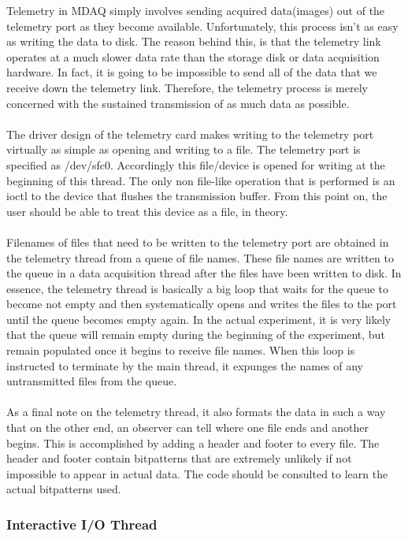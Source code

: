 Telemetry in MDAQ simply involves sending acquired data(images) out of the telemetry 
port as they become available. Unfortunately, this process isn't as easy as writing 
the data to disk. The reason behind this, is that the telemetry link operates at a 
much slower data rate than the storage disk or data acquisition hardware. In fact, it
is going to be impossible to send all of the data that we receive down the telemetry
link. Therefore, the telemetry process is merely concerned with the sustained transmission 
of as much data as possible.\\
\\
The driver design of the telemetry card makes writing to the telemetry port virtually as 
simple as opening and writing to a file. The telemetry port is specified as /dev/sfc0.
Accordingly this file/device is opened for writing at the beginning of this thread. The
only non file-like operation that is performed is an ioctl to the device that flushes the
transmission buffer. From this point on, the user should be able to treat this device as
a file, in theory.\\
\\
Filenames of files that need to be written to the telemetry port are obtained in the
telemetry thread from a queue of file names. These file names are written to the queue 
in a data acquisition thread after the files have been written to disk. In essence,
the telemetry thread is basically a big loop that waits for the queue to become not
empty and then systematically opens and writes the files to the port until the queue
becomes empty again. In the actual experiment, it is very likely that the queue will
remain empty during the beginning of the experiment, but remain populated once it 
begins to receive file names. When this loop is instructed to terminate by the main 
thread, it expunges the names of any untransmitted files from the queue.\\
\\
As a final note on the telemetry thread, it also formats the data in such a way that
on the other end, an observer can tell where one file ends and another begins. This 
is accomplished by adding a header and footer to every file. The header and footer
contain bitpatterns that are extremely unlikely if not impossible to appear in actual
data. The code should be consulted to learn the actual bitpatterns used.

\subsubsection{Interactive I/O Thread}

